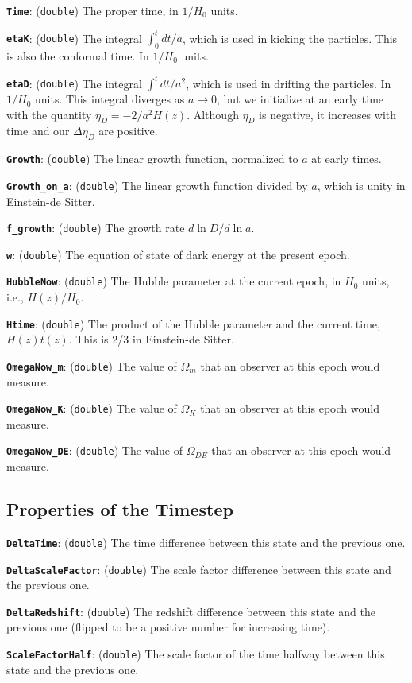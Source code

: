 \documentclass[11pt,preprint]{aastex}
\newcommand{\param}[2]{\medskip\noindent\textbf{\texttt{#1}}: ({\tt #2}) }
\begin{document}
\param{Time}{double} The proper time, in $1/H_0$ units.

\param{etaK}{double} The integral $\int_0^t dt/a$, which is used
in kicking the particles.  This is also the conformal time.  In
$1/H_0$ units.

\param{etaD}{double} The integral $\int^t dt/a^2$, which is used
in drifting the particles.  In $1/H_0$ units.  This integral diverges
as $a\rightarrow0$, but we initialize at an early time with the 
quantity $\eta_D = -2/a^2 H(z)$.  Although $\eta_D$ is negative,
it increases with time and our $\Delta\eta_D$ are positive.

\param{Growth}{double} The linear growth function, normalized to $a$ at early times.

\param{Growth\_on\_a}{double} The linear growth function divided by
$a$, which is unity in Einstein-de Sitter.

\param{f\_growth}{double} The growth rate $d\ln D/d\ln a$.

\param{w}{double} The equation of state of dark energy at the present epoch.

\param{HubbleNow}{double} The Hubble parameter at the current epoch,
in $H_0$ units, i.e., $H(z)/H_0$.

\param{Htime}{double} The product of the Hubble parameter and the
current time, $H(z) t(z)$.  This is 2/3 in Einstein-de Sitter.

\param{OmegaNow\_m}{double} The value of $\Omega_m$ that an observer
at this epoch would measure.

\param{OmegaNow\_K}{double} The value of $\Omega_K$ that an observer
at this epoch would measure.

\param{OmegaNow\_DE}{double} The value of $\Omega_{DE}$ that an
observer at this epoch would measure.

\subsection{Properties of the Timestep}

\param{DeltaTime}{double} The time difference between this state
and the previous one.

\param{DeltaScaleFactor}{double} The scale factor difference between
this state and the previous one.

\param{DeltaRedshift}{double} The redshift difference between this
state and the previous one (flipped to be a positive number for increasing
time).

\param{ScaleFactorHalf}{double} The scale factor of the time halfway
between this state and the previous one.
\end{document}

